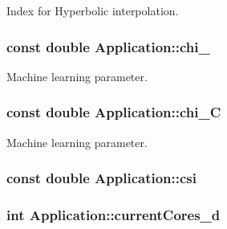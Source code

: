 Index for Hyperbolic interpolation. 

\hypertarget{classApplication_a6066fad4c229a6035652efd712d0d78c}{
\subsubsection[{chi\-\_\-0}]{\setlength{\rightskip}{0pt plus 5cm}const double Application\-::chi\-\_\hspace{0.3cm}{\ttfamily [private]}}}\label{classApplication_a6066fad4c229a6035652efd712d0d78c}


Machine learning parameter. 

\hypertarget{classApplication_a73d8a1604a2b2c99b14db1c8bd9c2798}{
\subsubsection[{chi\-\_\-\-C}]{\setlength{\rightskip}{0pt plus 5cm}const double Application\-::chi\-\_\-\-C\hspace{0.3cm}{\ttfamily [private]}}}\label{classApplication_a73d8a1604a2b2c99b14db1c8bd9c2798}


Machine learning parameter. 

\hypertarget{classApplication_a7c4d5b6d8d7b2c480008dbd958872ed2}{
\subsubsection[{csi}]{\setlength{\rightskip}{0pt plus 5cm}const double Application\-::csi\hspace{0.3cm}{\ttfamily [private]}}}\label{classApplication_a7c4d5b6d8d7b2c480008dbd958872ed2}
\hypertarget{classApplication_adee341a84a5389dfd4d16e7f8e697190}{
\subsubsection[{current\-Cores\-\_\-d}]{\setlength{\rightskip}{0pt plus 5cm}int Application\-::current\-Cores\-\_\-d\hspace{0.3cm}{\ttfamily [private]}}}\label{classApplication_adee341a84a5389dfd4d16e7f8e697190}



